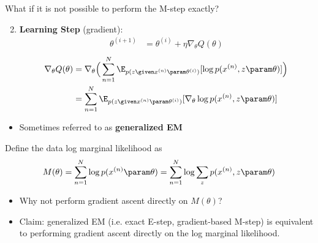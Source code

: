 \begin{frame}
\begin{center}
\end{center}
What if it is not possible to perform the M-step exactly?
\begin{enumerate}
 \setcounter{enumi}{1}
    \item \textbf{Learning Step} (gradient): 
        \begin{align*}
            \theta^{(i+1)} &= \theta^{(i)} + \eta \nabla_\theta Q(\theta)
        \end{align*} 
        \begin{align*}
            \nabla_\theta Q(\theta) &=\nabla_\theta \Big (\sum_{n=1}^N \E_{p(z \given x^{(n)} \param \theta^{(i)})}[\log p(x^{(n)}, z \param \theta)] \Big) \\
            &=\sum_{n=1}^N \E_{p(z \given x^{(n)} \param \theta^{(i)})}[\nabla_\theta \log p(x^{(n)}, z \param \theta)]
        \end{align*}
\end{enumerate}
\begin{itemize}
    \item Sometimes referred to as \textbf{generalized EM} \citep{neal1998,Murphy:2012:MLP:2380985}
\end{itemize}
\end{frame}

\begin{frame}
\begin{center}
\end{center}
Define the data log marginal likelihood as 
\[ M(\theta) = \sum_{n=1}^N \log p(x^{(n)} \param \theta) = \sum_{n=1}^N \log \sum_z p(x^{(n)}, z \param \theta)  \]

\begin{itemize}
    \item Why not perform gradient ascent directly on $M(\theta)$?
    \item Claim: generalized EM (i.e. exact E-step, gradient-based M-step) is equivalent to 
    performing gradient ascent directly on the log marginal likelihood.
\end{itemize}
\end{frame}



